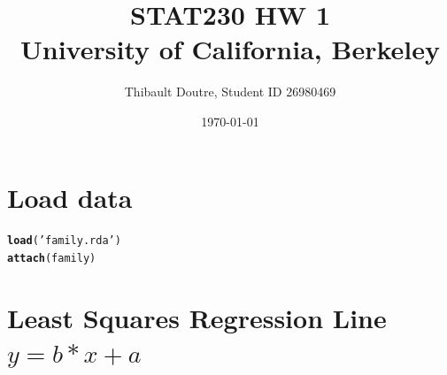 \documentclass[11pt]{article}\usepackage[]{graphicx}\usepackage[]{color}
\author{Thibault Doutre, Student ID 26980469}
\title{STAT230 HW 1 \\
University of California, Berkeley}
\date{\today}
\makeatletter
\newcommand{\hlstr}[1]{\textcolor[rgb]{0.192,0.494,0.8}{#1}}%
\newcommand{\hlstd}[1]{\textcolor[rgb]{0.345,0.345,0.345}{#1}}%
\newcommand{\hlkwd}[1]{\textcolor[rgb]{0.737,0.353,0.396}{\textbf{#1}}}%
\newenvironment{kframe}{%
 \def\at@end@of@kframe{}%
 \ifinner\ifhmode%
  \def\at@end@of@kframe{\end{minipage}}%
  \begin{minipage}{\columnwidth}%
 \fi\fi%
 \def\FrameCommand##1{\hskip\@totalleftmargin \hskip-\fboxsep
 \colorbox{shadecolor}{##1}\hskip-\fboxsep
     \hskip-\linewidth \hskip-\@totalleftmargin \hskip\columnwidth}%
 \MakeFramed {\advance\hsize-\width
   \@totalleftmargin\z@ \linewidth\hsize
   \@setminipage}}%
 {\par\unskip\endMakeFramed%
 \at@end@of@kframe}
\newenvironment{knitrout}{}{} %
\makeatother
\begin{document}
\maketitle


\section{Load data} 

\begin{knitrout}
\color{fgcolor}\begin{kframe}
\begin{alltt}
\hlkwd{load}\hlstd{(}\hlstr{'family.rda'}\hlstd{)}
\hlkwd{attach}\hlstd{(family)}
\end{alltt}
\end{kframe}
\end{knitrout}

\section{Least Squares Regression Line
 $y = b*x + a$} 
 
\end{document}
